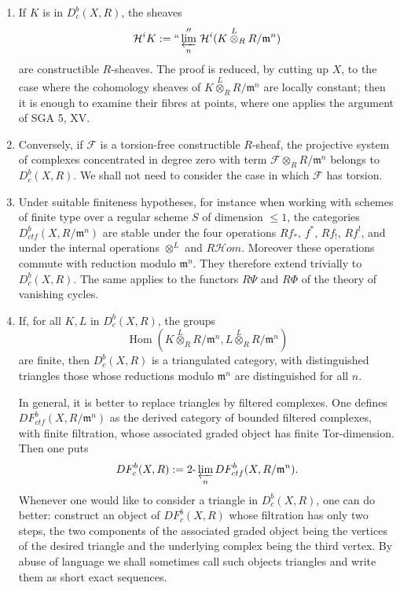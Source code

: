 \documentclass[11pt]{article}
\theoremstyle{remark}
\newcommand{\Hom}{\operatorname{Hom}}
\newcommand{\limproj}{\varprojlim}
\begin{document}
\begin{enumerate}[label=\alph*)]
\item If $K$ is in $D^b_c(X,R)$, the sheaves
\[
\mathcal H^iK := ``\limproj_n''\,\mathcal H^i(K\overset L\otimes_R R/\mathfrak m^n)
\]
are constructible $R$-sheaves. The proof is reduced, by cutting up $X$, to the case where the cohomology sheaves of $K\overset L\otimes_R R/\mathfrak m^n$ are locally constant; then it is enough to examine their fibres at points, where one applies the argument of SGA 5, XV.

\item Conversely, if $\mathcal F$ is a torsion-free constructible $R$-sheaf, the projective system of complexes concentrated in degree zero with term $\mathcal F\otimes_R R/\mathfrak m^n$ belongs to $D^b_c(X,R)$. We shall not need to consider the case in which $\mathcal F$ has torsion.

\item Under suitable finiteness hypotheses, for instance when working with schemes of finite type over a regular scheme $S$ of dimension $\le1$, the categories $D^b_{ctf}(X,R/\mathfrak m^n)$ are stable under the four operations $Rf_{*}$, $f^*$, $Rf_{!}$, $Rf^!$, and under the internal operations $\otimes^L$ and $R\mathcal Hom$. Moreover these operations commute with reduction modulo $\mathfrak m^n$. They therefore extend trivially to $D^b_c(X,R)$. The same applies to the functors $R\Psi$ and $R\Phi$ of the theory of vanishing cycles.

\item If, for all $K,L$ in $D^b_c(X,R)$, the groups
\[
\Hom(K\overset L\otimes_R R/\mathfrak m^n,
     L\overset L\otimes_R R/\mathfrak m^n)
\]
are finite, then $D^b_c(X,R)$ is a triangulated category, with distinguished triangles those whose reductions modulo $\mathfrak m^n$ are distinguished for all $n$.

In general, it is better to replace triangles by filtered complexes. One defines $DF^b_{ctf}(X,R/\mathfrak m^n)$ as the derived category of bounded filtered complexes, with finite filtration, whose associated graded object has finite Tor-dimension. Then one puts
\[
DF^b_c(X,R):=2\text{-}\limproj_n DF^b_{ctf}(X,R/\mathfrak m^n).
\]
Whenever one would like to consider a triangle in $D^b_c(X,R)$, one can do better: construct an object of $DF^b_c(X,R)$ whose filtration has only two steps, the two components of the associated graded object being the vertices of the desired triangle and the underlying complex being the third vertex. By abuse of language we shall sometimes call such objects triangles and write them as short exact sequences.


\end{enumerate}
\end{document}
